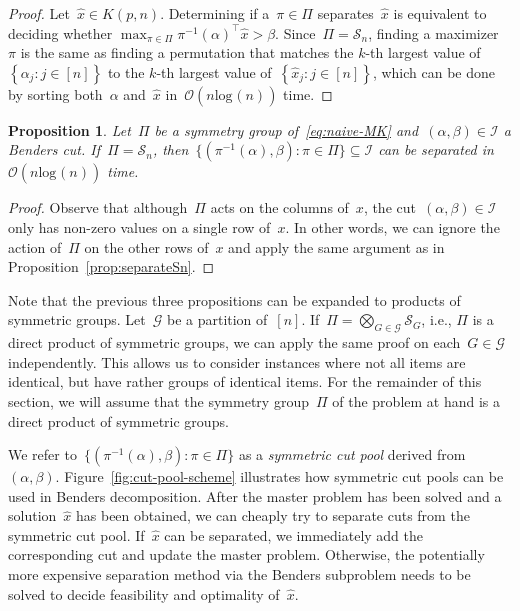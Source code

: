 \documentclass[a4paper,10pt]{article}
\newcommand{\fixed}[1]{\hat{ #1 }}
\newcommand{\sym}[1]{\mathcal{S}_{#1}}
\renewcommand{\log}[2][]{\text{log}_{#1}\left( #2 \right)}
\newcommand{\sprod}[2]{#1^\top #2}
\newcommand{\brackets}[1]{\left\{ #1 \right\}}
\newcommand{\parentheses}[1]{\left( #1 \right)}
\newcommand{\Oh}[1]{\mathcal{O}\parentheses{ #1 }}
\newtheorem{proposition}[theorem]{Proposition}
\theoremstyle{definition}
\begin{document}
%
\begin{proof}
  Let~$\fixed{x} \in K(p,n)$.
  Determining if a~$\pi\in\Pi$ separates~$\fixed{x}$ is equivalent to deciding whether $\max_{\pi\in\Pi}\sprod{\pi^{-1}(\alpha)}{\fixed{x}} > \beta$.
  Since~$\Pi=\sym{n}$, finding a maximizer~$\pi$ is the same as finding a permutation that matches the $k$-th largest value of~$\brackets{\alpha_j : j\in [n]}$ to the $k$-th largest value of~$\brackets{\fixed{x}_j : j\in [n]}$, which can be done by sorting both~$\alpha$ and~$\fixed{x}$ in~$\Oh{n\log[]{n}}$ time.  
\end{proof}

\begin{proposition}
  \label{prop:separate-benders}
  Let~$\Pi$ be a symmetry group of~\eqref{eq:naive-MK} and~$(\alpha, \beta) \in \mathcal{I}$ a Benders cut.
  If~$\Pi = \sym{n}$, then~$\{(\pi^{-1}(\alpha),\beta) : \pi\in\Pi\} \subseteq \mathcal{I}$ can be separated in~$\Oh{n\log{n}}$ time.
\end{proposition}
%
\begin{proof}
  Observe that although~$\Pi$ acts on the columns of~$x$, the cut~$(\alpha, \beta)\in\mathcal{I}$ only has non-zero values on a single row of~$x$.
  In other words, we can ignore the action of~$\Pi$ on the other rows of~$x$ and apply the same argument as in Proposition~\ref{prop:separateSn}.
\end{proof}
%
Note that the previous three propositions can be expanded to products of symmetric groups.
Let~$\mathcal{G}$ be a partition of~$[n]$.
If~$\Pi = \bigotimes_{G\in \mathcal{G}} \sym{G}$, i.e., $\Pi$ is a direct product of symmetric groups, we can apply the same proof on each~$G\in\mathcal{G}$ independently.
This allows us to consider instances where not all items are identical, but have rather groups of identical items.
For the remainder of this section, we will assume that the symmetry group~$\Pi$ of the problem at hand is a direct product of symmetric groups.

We refer to~$\{(\pi^{-1}(\alpha),\beta) : \pi\in\Pi\}$ as a \emph{symmetric cut pool} derived from~$(\alpha,\beta)$.
Figure~\ref{fig:cut-pool-scheme} illustrates how symmetric cut pools can be used in Benders decomposition.
After the master problem has been solved and a solution~$\fixed{x}$ has been obtained, we can cheaply try to separate cuts from the symmetric cut pool.
If~$\fixed{x}$ can be separated, we immediately add the corresponding cut and update the master problem.
Otherwise, the potentially more expensive separation method via the Benders subproblem needs to be solved to decide feasibility and optimality of~$\hat{x}$. 
\end{document}
